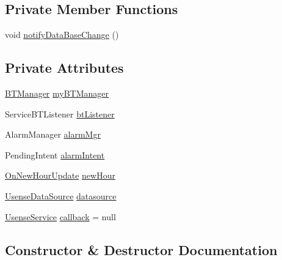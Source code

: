 \subsection*{Private Member Functions}
\begin{DoxyCompactItemize}
\item 
void \hyperlink{classcs_1_1usense_1_1bluetooth_1_1_bluetooth_core_aa40b5bb3e664db51120610aa0bc9fa37}{notify\+Data\+Base\+Change} ()
\end{DoxyCompactItemize}
\subsection*{Private Attributes}
\begin{DoxyCompactItemize}
\item 
\hyperlink{classcs_1_1usense_1_1bluetooth_1_1_b_t_manager}{B\+T\+Manager} \hyperlink{classcs_1_1usense_1_1bluetooth_1_1_bluetooth_core_a2024dd27fc068e407b40516db1fb6241}{my\+B\+T\+Manager}
\item 
Service\+B\+T\+Listener \hyperlink{classcs_1_1usense_1_1bluetooth_1_1_bluetooth_core_a52294198085ae6821a81c20374637fea}{bt\+Listener}
\item 
Alarm\+Manager \hyperlink{classcs_1_1usense_1_1bluetooth_1_1_bluetooth_core_ac6a1ec397501356002eca225b76c1707}{alarm\+Mgr}
\item 
Pending\+Intent \hyperlink{classcs_1_1usense_1_1bluetooth_1_1_bluetooth_core_a7e8f1e01ff2ea047e31f9e9166cbf8a3}{alarm\+Intent}
\item 
\hyperlink{classcs_1_1usense_1_1bluetooth_1_1_on_new_hour_update}{On\+New\+Hour\+Update} \hyperlink{classcs_1_1usense_1_1bluetooth_1_1_bluetooth_core_a1c186de0a5f8b59eb29433c322498b1c}{new\+Hour}
\item 
\hyperlink{classcs_1_1usense_1_1db_1_1_usense_data_source}{Usense\+Data\+Source} \hyperlink{classcs_1_1usense_1_1bluetooth_1_1_bluetooth_core_ad72cf575891bf65d1b9f82057fc84708}{datasource}
\item 
\hyperlink{classcs_1_1usense_1_1_usense_service}{Usense\+Service} \hyperlink{classcs_1_1usense_1_1bluetooth_1_1_bluetooth_core_a5530810b882ef730a46d074198ea451e}{callback} = null
\end{DoxyCompactItemize}


\subsection{Constructor \& Destructor Documentation}
\hypertarget{classcs_1_1usense_1_1bluetooth_1_1_bluetooth_core_a9af11f1f986f7f68855dde14466786de}{}
